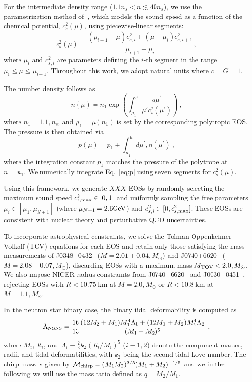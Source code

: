 \documentclass[twocolumn]{aastex631}
\begin{document}
	For the intermediate density range ($1.1 n_s < n \lesssim 40 n_s$), we use the parametrization method of~\citet{Annala2019}, which models the sound speed as a function of the chemical potential, $c_s^2(\mu)$, using piecewise-linear segments:
	\begin{equation} \label{eq:cs2}
		c_s^2(\mu) = \frac{\left(\mu_{i+1}-\mu \right) c_{s,i}^2 + \left(\mu - \mu_i \right) c_{s,i+1}^2}{\mu_{i+1}-\mu_i}~, 
	\end{equation}
	where $\mu_i$ and $c_{s,i}^2$ are parameters defining the $i$-th segment in the range $\mu_i \leq \mu \leq \mu_{i+1}$.
	Throughout this work, we adopt natural units where $c=G=1$.
	
	The number density follows as 
	\begin{equation} \label{eq:n}
		n(\mu) = n_1 \exp \left({\int_{\mu_1}^\mu \frac{d\mu^\prime}{\mu^\prime c_s^2(\mu^\prime)}}\right)~, 
	\end{equation} where $n_1 = 1.1,n_s$, and $\mu_1 = \mu(n_1)$ is set by the corresponding polytropic EOS.
	The pressure is then obtained via
	\begin{equation} \label{eq:p}
		p(\mu) = p_1 + \int_{\mu_1}^\mu d\mu^\prime , n(\mu^\prime)~,
	\end{equation}
	where the integration constant $p_1$ matches the pressure of the polytrope at $n = n_1$.
	We numerically integrate Eq.~\eqref{eq:p} using seven segments for $c_s^2(\mu)$.
	
	Using this framework, we generate $XXX$ EOSs by randomly selecting the maximum sound speed $c_{s,{\rm max}}^2 \in [0,1]$ and uniformly sampling the free parameters $\mu_i \in [\mu_1, \mu_{N+1}]$ (where $\mu_{N+1} = 2.6\rm GeV$) and $c_{s,i}^2 \in [0, c_{s,{\rm max}}^2]$. These EOSs are consistent with nuclear theory and perturbative QCD uncertainties.
	
	To incorporate astrophysical constraints, we solve the Tolman-Oppenheimer-Volkoff (TOV) equations for each EOS and retain only those satisfying the mass measurements of J0348+0432~\citep{Antoniadis2013} ($M = 2.01\pm 0.04,M_{\odot}$) and J0740+6620~\citep{Cromartie2019, Fonseca2021} ($M = 2.08 \pm 0.07,M_{\odot}$), discarding EOSs with a maximum mass $M_{\rm TOV} < 2.0,M_{\odot}$. We also impose NICER radius constraints from J0740+6620~\citep{Miller2021, Riley2021} and J0030+0451~\citep{Riley2019, MCMiller2019b}, rejecting EOSs with $R < 10.75$ km at $M = 2.0,M_{\odot}$ or $R < 10.8$ km at $M = 1.1,M_{\odot}$.
	
	In the neutron star binary case, the binary tidal deformability is computed as
	\begin{equation} 
		\tilde{\Lambda}_{\rm NSNS} = \frac{16}{13} \frac{ (12M_2 + M_1) M_1^4 \Lambda_1 + (12M_1 + M_2) M_2^4 \Lambda_2}{(M_1 + M_2)^5}~,
	\end{equation}
	where $M_i$, $R_i$, and $\Lambda_i = \frac{2}{3} k_2 \left( R_i/M_i \right)^5$ ($i=1,2$) denote the component masses, radii, and tidal deformabilities, with $k_2$ being the second tidal Love number.
	The chirp mass is given by $\mathcal{M}_{\rm chirp} = (M_1 M_2)^{3/5} (M_1+M_2)^{-1/5}$ and we in the following we will use the mass ratio defined as $q = M_2/M_1$.
	
\end{document}
